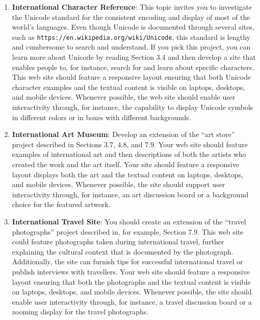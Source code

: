 \documentclass[11pt]{article}
\newcommand{\url}[1]{\lstinline{#1}}
\begin{document}
\begin{enumerate}

  \setlength{\itemsep}{0in}

  \item {\bf International Character Reference}: This topic invites you to
    investigate the Unicode standard for the consistent encoding and display of
    most of the world's languages. Even though Unicode is documented through
    several sites, such as \url{https://en.wikipedia.org/wiki/Unicode}, this
    standard is lengthy and cumbersome to search and understand. If you pick
    this project, you can learn more about Unicode by reading Section 3.4 and
    then develop a site that enables people to, for instance, search for and
    learn about specific characters. This web site should feature a responsive
    layout ensuring that both Unicode character examples and the textual content
    is visible on laptops, desktops, and mobile devices. Whenever possible, the
    web site should enable user interactivity through, for instance, the
    capability to display Unicode symbols in different colors or in boxes with
    different backgrounds.

  \item {\bf International Art Museum}: Develop an extension of the ``art
    store'' project described in Sections 3.7, 4.8, and 7.9. Your web site
    should feature examples of international art and then descriptions of both
    the artists who created the work and the art itself. Your site should
    feature a responsive layout displays both the art and the textual content on
    laptops, desktops, and mobile devices. Whenever possible, the site should
    support user interactivity through, for instance, an art discussion board or
    a background choice for the featured artwork.

  \item {\bf International Travel Site}: You should create an extension of the
    ``travel photographs'' project described in, for example, Section 7.9. This
    web site could feature photographs taken during international travel,
    further explaining the cultural context that is documented by the
    photograph. Additionally, the site can furnish tips for successful
    international travel or publish interviews with travellers. Your web site
    should feature a responsive layout ensuring that both the photographs and
    the textual content is visible on laptops, desktops, and mobile devices.
    Whenever possible, the site should enable user interactivity through, for
    instance, a travel discussion board or a zooming display for the travel
    photographs.


\end{enumerate}
\end{document}
